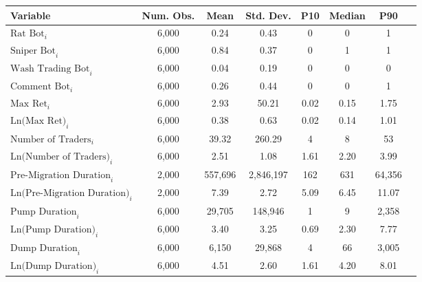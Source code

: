 \begin{tabular}{lccccccc}
\toprule
Variable & Num. Obs. & Mean & Std. Dev. & P10 & Median & P90\\
\midrule
$\text{Rat Bot}_{i}$ & 6,000 & 0.24 & 0.43 & 0 & 0 & 1\\
$\text{Sniper Bot}_{i}$ & 6,000 & 0.84 & 0.37 & 0 & 1 & 1\\
$\text{Wash Trading Bot}_{i}$ & 6,000 & 0.04 & 0.19 & 0 & 0 & 0\\
$\text{Comment Bot}_{i}$ & 6,000 & 0.26 & 0.44 & 0 & 0 & 1\\
$\text{Max Ret}_{i}$ & 6,000 & 2.93 & 50.21 & 0.02 & 0.15 & 1.75\\
$\text{Ln(Max Ret)}_{i}$ & 6,000 & 0.38 & 0.63 & 0.02 & 0.14 & 1.01\\
$\text{Number of Traders}_{i}$ & 6,000 & 39.32 & 260.29 & 4 & 8 & 53\\
$\text{Ln(Number of Traders)}_{i}$ & 6,000 & 2.51 & 1.08 & 1.61 & 2.20 & 3.99\\
$\text{Pre-Migration Duration}_{i}$ & 2,000 & 557,696 & 2,846,197 & 162 & 631 & 64,356\\
$\text{Ln(Pre-Migration Duration)}_{i}$ & 2,000 & 7.39 & 2.72 & 5.09 & 6.45 & 11.07\\
$\text{Pump Duration}_{i}$ & 6,000 & 29,705 & 148,946 & 1 & 9 & 2,358\\
$\text{Ln(Pump Duration)}_{i}$ & 6,000 & 3.40 & 3.25 & 0.69 & 2.30 & 7.77\\
$\text{Dump Duration}_{i}$ & 6,000 & 6,150 & 29,868 & 4 & 66 & 3,005\\
$\text{Ln(Dump Duration)}_{i}$ & 6,000 & 4.51 & 2.60 & 1.61 & 4.20 & 8.01\\
\bottomrule
\end{tabular}